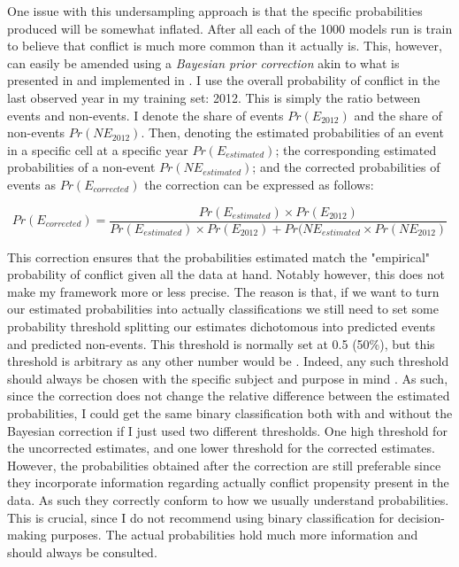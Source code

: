 \documentclass[a4paper]{article}
\begin{document}
One issue with this undersampling approach is that the specific probabilities produced will be somewhat inflated. After all each of the 1000 models run is train to believe that conflict is much more common than it actually is. This, however, can easily be amended using a \emph{Bayesian prior correction} akin to what is presented in \cite{King_Zeng_2001, king_zeng_2001b} and implemented in \cite{Goldstone_2010}. I use the overall probability of conflict in the last observed year in my training set: 2012. This is simply the ratio between events and non-events. I denote the share of events $Pr(E_{2012})$ and the share of non-events $Pr(NE_{2012})$. Then, denoting the estimated probabilities of an event in a specific cell at a specific year $Pr(E_{estimated})$; the corresponding estimated probabilities of a non-event $Pr(NE_{estimated})$; and the corrected probabilities of events as $Pr(E_{corrected})$ the correction can be expressed as follows:

\[
Pr(E_{corrected}) = \frac{Pr(E_{estimated}) \times Pr(E_{2012})}{Pr(E_{estimated}) \times Pr(E_{2012})+Pr(NE_{estimated} \times Pr(NE_{2012})} \tag{14} \label{eq:bayesC}
\]

This correction ensures that the probabilities estimated match the "empirical" probability of conflict given all the data at hand. Notably however, this does not make my framework more or less precise. The reason is that, if we want to turn our estimated probabilities into actually classifications we still need to set some probability threshold splitting our estimates dichotomous into predicted events and predicted non-events. This threshold is normally set at 0.5 (50\%), but this threshold is arbitrary as any other number would be \citep[890-891]{weidmann_ward_2010predicting}. Indeed, any such threshold should always be chosen with the specific subject and purpose in mind \citep[194]{Goldstone_2010}. As such, since the correction does not change the relative difference between the estimated probabilities, I could get the same binary classification both with and without the Bayesian correction if I just used two different thresholds. One high threshold for the uncorrected estimates, and one lower threshold for the corrected estimates. However, the probabilities obtained after the correction are still preferable since they incorporate information regarding actually conflict propensity present in the data. As such they correctly conform to how we usually understand probabilities. This is crucial, since I do not recommend using binary classification for decision-making purposes. The actual probabilities hold much more information and should always be consulted.\par
\end{document}

